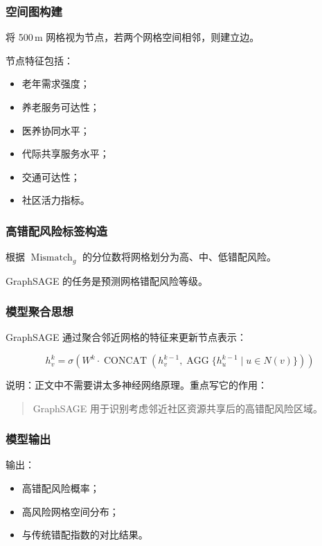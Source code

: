 \subsubsection{空间图构建}

将 500\,m 网格视为节点，若两个网格空间相邻，则建立边。

节点特征包括：

\begin{itemize}
\item 老年需求强度；
\item 养老服务可达性；
\item 医养协同水平；
\item 代际共享服务水平；
\item 交通可达性；
\item 社区活力指标。
\end{itemize}

\subsubsection{高错配风险标签构造}

根据 $\operatorname{Mismatch}_g$ 的分位数将网格划分为高、中、低错配风险。

GraphSAGE 的任务是预测网格错配风险等级。

\subsubsection{模型聚合思想}

GraphSAGE 通过聚合邻近网格的特征来更新节点表示：

\begin{equation}
h_v^k = \sigma \left(W^k \cdot \operatorname{CONCAT}\left(h_v^{k-1}, \operatorname{AGG}\{h_u^{k-1}\mid u \in N(v)\}\right)\right)
\end{equation}

说明：正文中不需要讲太多神经网络原理。重点写它的作用：

\begin{quote}
GraphSAGE 用于识别考虑邻近社区资源共享后的高错配风险区域。
\end{quote}

\subsubsection{模型输出}

输出：

\begin{itemize}
\item 高错配风险概率；
\item 高风险网格空间分布；
\item 与传统错配指数的对比结果。
\end{itemize}

